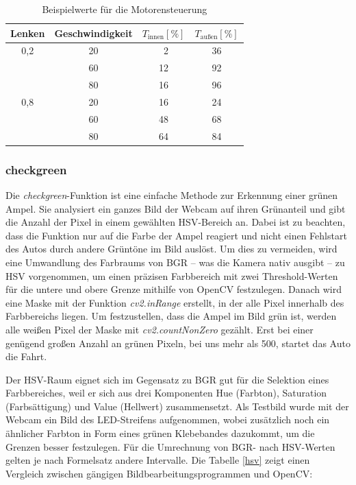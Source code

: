 \documentclass[a4paper, 12pt]{scrartcl}
\begin{document}
\begin{table}[H]
	\centering
	\begin{tabular}{c|c|c|c}
		Lenken & Geschwindigkeit & $T_{\text{innen}} [\%]$ &  $T_{\text{außen}}[\%]$ \\ \hline 
		0,2 & 20 & \ 2 & 36 \\  
		    & 60 & 12  & 92 \\    
		    & 80 & 16  & 96 \\ \hline
		0,8 & 20 & 16  & 24 \\
		    & 60 & 48  & 68 \\
		    & 80 & 64  & 84 \\
	\end{tabular} 
	\caption{Beispielwerte für die Motorensteuerung}
\end{table}

\subsubsection{checkgreen}


Die \textit{checkgreen}-Funktion ist eine einfache Methode zur Erkennung einer grünen Ampel. Sie analysiert ein ganzes Bild der Webcam auf ihren Grünanteil und gibt die Anzahl der Pixel in einem gewählten HSV-Bereich an. Dabei ist zu beachten, dass die Funktion nur auf die Farbe der Ampel reagiert und nicht einen Fehlstart des Autos durch andere Grüntöne im Bild auslöst. Um dies zu vermeiden, wird eine Umwandlung des Farbraums von BGR -- was die Kamera nativ ausgibt -- zu HSV vorgenommen, um einen präzisen Farbbereich mit zwei Threshold-Werten für die untere und obere Grenze mithilfe von OpenCV festzulegen. Danach wird eine Maske mit der Funktion \textit{cv2.inRange} erstellt, in der alle Pixel innerhalb des Farbbereichs liegen.
Um festzustellen, dass die Ampel im Bild grün ist, werden alle weißen Pixel der Maske mit \textit{cv2.countNonZero} gezählt. Erst bei einer genügend großen Anzahl an grünen Pixeln, bei uns mehr als 500, startet das Auto die Fahrt.

Der HSV-Raum eignet sich im Gegensatz zu BGR gut für die Selektion eines Farbbereiches, weil er sich aus drei Komponenten Hue (Farbton), Saturation (Farbsättigung) und Value (Hellwert) zusammensetzt. Als Testbild wurde mit der Webcam ein Bild des LED-Streifens aufgenommen, wobei zusätzlich noch ein ähnlicher Farbton in Form eines grünen Klebebandes dazukommt, um die Grenzen besser festzulegen. Für die Umrechnung von BGR- nach HSV-Werten gelten je nach Formelsatz andere Intervalle. Die Tabelle \ref{hsv} zeigt einen Vergleich zwischen gängigen Bildbearbeitungsprogrammen und OpenCV:
\end{document}
